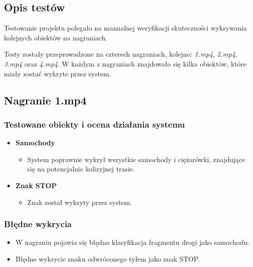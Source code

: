 \subsection{Opis testów}
Testowanie projektu polegało na manualnej weryfikacji skuteczności wykrywania kolejnych obiektów na
nagraniach.

Testy zostały przeprowadzone na czterech nagraniach, kolejno: \textit{1.mp4}, \textit{2.mp4}, \textit{3.mp4}
oraz \textit{4.mp4}.
W każdym z nagraniach znajdowało się kilka obiektów, które miały zostać wykryte przez system.


\subsection{Nagranie 1.mp4}

\subsubsection*{Testowane obiekty i ocena działania systemu}
\begin{itemize}
    \item \textbf{Samochody}
          \begin{itemize}
              \item System poprawnie wykrył wszystkie samochody i ciężarówki, znajdujące się na potencjalnie kolizyjnej trasie.
          \end{itemize}
    \item \textbf{Znak STOP}
          \begin{itemize}
              \item Znak został wykryty przez system.
          \end{itemize}
\end{itemize}

\subsubsection*{Błędne wykrycia}
\begin{itemize}
    \item W nagraniu pojawia się błędna klasyfikacja fragmentu drogi jako samochodu.
    \item Błędne wykrycie znaku odwróconego tyłem jako znak STOP.
\end{itemize}


